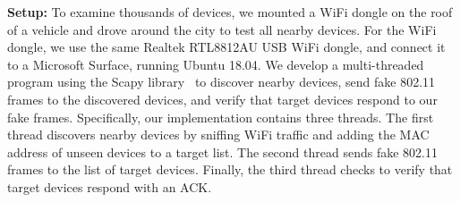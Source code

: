 \vspace{0.05in}
\noindent
\textbf{Setup:} To examine thousands of devices, we mounted a WiFi dongle on the roof of a vehicle and drove around the city to test all nearby devices. For the WiFi dongle, we use the same  Realtek  RTL8812AU  USB  WiFi dongle, and connect it to a Microsoft Surface, running Ubuntu 18.04. We develop a multi-threaded program using the Scapy library~\cite{scapy} to discover nearby devices, send fake 802.11 frames to the discovered devices, and verify that target devices respond to our fake frames. Specifically, our implementation contains three threads. The first thread discovers nearby devices by sniffing WiFi traffic and adding the MAC address of unseen devices to a target list. The second thread sends fake 802.11 frames to the list of target devices. Finally, the third thread checks to verify that target devices respond with an ACK. 



